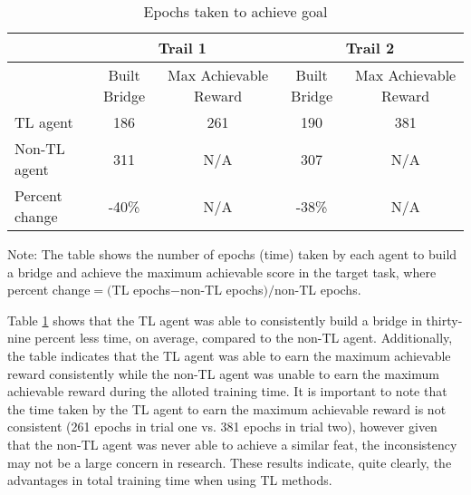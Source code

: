 \documentclass{llncs}
\begin{document}
\renewcommand{\arraystretch}{1.2}
\begin{table}[htb]
  \begin{threeparttable}
    \caption{Epochs taken to achieve goal}\label{tab:1}
    \begin{tabular}{l|c|c|c|c} 
      \hline
      & \multicolumn{2}{|c|}{Trail 1} & \multicolumn{2}{|c}{Trail 2} \\
      \hline
                     & Built Bridge & \multicolumn{1}{p{2.5cm}|}{\centering Max Achievable Reward} & Built Bridge & \multicolumn{1}{p{2.5cm}}{\centering Max Achievable Reward} \\
      \hline
      TL agent       & 186          & 261                      & 190          & 381                      \\
      Non-TL agent   & 311          & N/A                      & 307          & N/A                      \\
      Percent change & -40\%        & N/A                      & -38\%        & N/A                      \\ 
      \hline
    \end{tabular}
    \begin{tablenotes}[flushleft]\footnotesize
    \item{Note: The table shows the number of epochs (time) taken by each agent to build a bridge and achieve the maximum achievable score in the target task, where percent change$=($TL epochs$-$non-TL epochs$)/$non-TL epochs.}
    \end{tablenotes}
  \end{threeparttable}
\end{table}

Table \ref{tab:1} shows that the TL agent was able to consistently build a bridge in thirty-nine percent less time, on average, compared to the non-TL agent. 
Additionally, the table indicates that the TL agent was able to earn the maximum achievable reward consistently while the non-TL agent was unable to earn the maximum achievable reward during the alloted training time. 
It is important to note that the time taken by the TL agent to earn the maximum achievable reward is not consistent (261 epochs in trial one vs. 381 epochs in trial two), however given that the non-TL agent was never able to achieve a similar feat, the inconsistency may not be a large concern in research. 
These results indicate, quite clearly, the advantages in total training time when using TL methods. 
\end{document}
